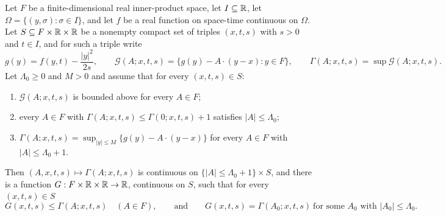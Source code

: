 \begin{lemma}
Let $F$ be a finite-dimensional real inner-product space, let $I\subseteq\mathbb{R}$, let
$\Omega=\{(y,\sigma):\sigma\in I\}$, and let $f$ be a real function on space-time
continuous on $\Omega$. Let $S\subseteq F\times\mathbb{R}\times\mathbb{R}$ be a nonempty compact
set of triples $(x,t,s)$ with $s>0$ and $t\in I$, and for such a triple write
\[
  g(y)=f(y,t)-\frac{|y|^2}{2s},
  \qquad
  \mathcal G(A;x,t,s)=\bigl\{g(y)-A\cdot(y-x):y\in F\bigr\},
  \qquad
  \Gamma(A;x,t,s)=\sup\mathcal G(A;x,t,s).
\]
Let $\Lambda_0\ge0$ and $M>0$ and assume that for every $(x,t,s)\in S$:
\begin{enumerate}
\item[(i)] $\mathcal G(A;x,t,s)$ is bounded above for every $A\in F$;
\item[(ii)] every $A\in F$ with $\Gamma(A;x,t,s)\le\Gamma(0;x,t,s)+1$ satisfies
$|A|\le\Lambda_0$;
\item[(iii)] $\Gamma(A;x,t,s)=\sup_{|y|\le M}\{g(y)-A\cdot(y-x)\}$ for every
$A\in F$ with $|A|\le\Lambda_0+1$.
\end{enumerate}
Then $(A,x,t,s)\mapsto\Gamma(A;x,t,s)$ is continuous on
$\{|A|\le\Lambda_0+1\}\times S$, and there is a function
$G:F\times\mathbb{R}\times\mathbb{R}\to\mathbb{R}$, continuous on $S$, such that for every
$(x,t,s)\in S$
\[
  G(x,t,s)\le\Gamma(A;x,t,s)\quad(A\in F),
  \qquad\text{and}\qquad
  G(x,t,s)=\Gamma(A_0;x,t,s)\ \text{for some }A_0\text{ with }|A_0|\le\Lambda_0 .
\]
\end{lemma}
